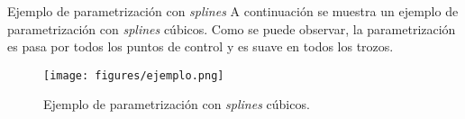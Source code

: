 \begin{frame}{Ejemplo de parametrización con \textit{splines}}
  A continuación se muestra un ejemplo de parametrización con
  \textit{splines} cúbicos. Como se puede observar, la parametrización
  es pasa por todos los puntos de control y es suave en todos los
  trozos.

  \begin{figure}
    \centering
    \texttt{[image: figures/ejemplo.png]}
    \caption{Ejemplo de parametrización con \textit{splines} cúbicos.}
  \end{figure}
\end{frame}
